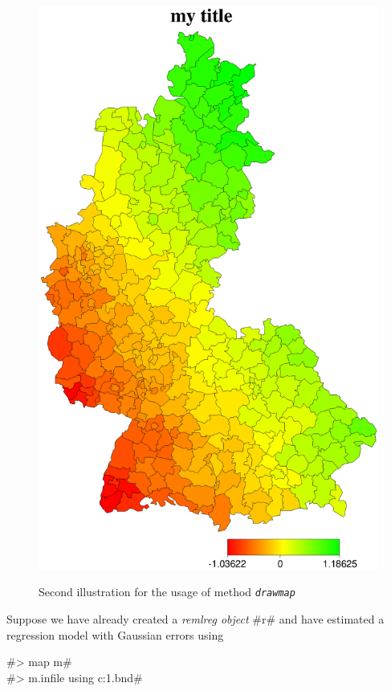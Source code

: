 \begin{figure}[ht]
\begin{center}
\includegraphics[scale=0.4]{grafiken/remlregdrawmapexample2.ps}
{\em \caption{ \label{remlregdrawmapexample2} Second illustration
for the usage of method \em\texttt{drawmap}}}
\end{center}
\end{figure}

Suppose we have already created a {\em remlreg object} #r# and
have estimated a regression model with Gaussian errors using

#> map m# \\
#> m.infile using c:\maps\map1.bnd#


